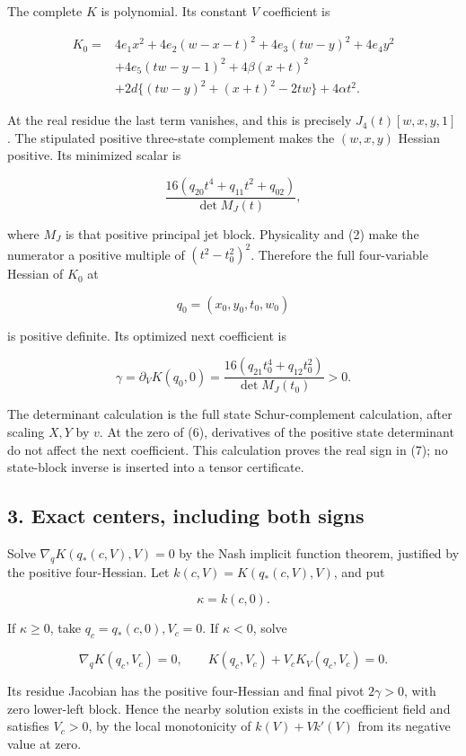 The complete \(K\) is polynomial. Its constant \(V\) coefficient is

\[
\begin{aligned}
K_0={}&4e_1x^2+4e_2(w-x-t)^2+4e_3(tw-y)^2+4e_4y^2\\
&+4e_5(tw-y-1)^2+4\beta(x+t)^2\\
&+2d\{(tw-y)^2+(x+t)^2-2tw\}+4\alpha t^2.
\end{aligned}
\tag{5}
\]

At the real residue the last term vanishes, and this is precisely
\(J_4(t)[w,x,y,1]\). The stipulated positive three-state complement makes
the \((w,x,y)\) Hessian positive. Its minimized scalar is

\[
\frac{16(q_{20}t^4+q_{11}t^2+q_{02})}{\det M_J(t)},
\tag{6}
\]

where \(M_J\) is that positive principal jet block. Physicality and (2)
make the numerator a positive multiple of \((t^2-t_0^2)^2\). Therefore
the full four-variable Hessian of \(K_0\) at

\[
q_0=(x_0,y_0,t_0,w_0)
\]

is positive definite. Its optimized next coefficient is

\[
\gamma=\partial_V K(q_0,0)
=\frac{16(q_{21}t_0^4+q_{12}t_0^2)}{\det M_J(t_0)}>0.
\tag{7}
\]

The determinant calculation is the full state Schur-complement calculation,
after scaling \(X,Y\) by \(v\). At the zero of (6), derivatives of the
positive state determinant do not affect the next coefficient. This
calculation proves the real sign in (7); no state-block inverse is inserted
into a tensor certificate.

\hypertarget{exact-centers-including-both-signs}{%
\subsection{3. Exact centers, including both signs}\label{p03b551f2a9a0:exact-centers-including-both-signs}}

Solve \(\nabla_qK(q_*(c,V),V)=0\) by the Nash implicit function theorem, justified by the positive
four-Hessian. Let \(k(c,V)=K(q_*(c,V),V)\), and put

\[
\kappa=k(c,0).
\]

If \(\kappa\ge0\), take \(q_c=q_*(c,0),V_c=0\). If \(\kappa<0\), solve

\[
\nabla_qK(q_c,V_c)=0,\qquad
K(q_c,V_c)+V_c K_V(q_c,V_c)=0.
\tag{8}
\]

Its residue Jacobian has the positive four-Hessian and final pivot
\(2\gamma>0\), with zero lower-left block. Hence the nearby solution
exists in the coefficient field and satisfies \(V_c>0\), by the local
monotonicity of \(k(V)+Vk'(V)\) from its negative value at zero.


